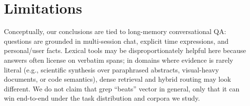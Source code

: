 \documentclass[sigconf,nonacm]{acmart}
\begin{document}
  \section{Limitations}
  \label{sec:limitations}
  Conceptually, our conclusions are tied to long-memory conversational QA: questions are grounded in multi-session chat, explicit time expressions, and personal/user facts. Lexical tools may be disproportionately helpful here because answers often license on verbatim spans; in domains where evidence is rarely literal (e.g., scientific synthesis over paraphrased abstracts, visual-heavy documents, or code semantics), dense retrieval and hybrid routing may look different. We do not claim that grep ``beats'' vector in general, only that it can win end-to-end under the task distribution and corpora we study. 




\end{document}
